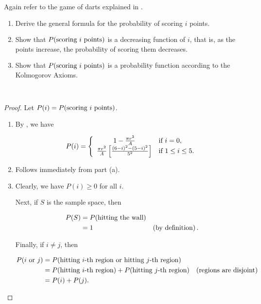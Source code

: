 \documentclass[12pt,letterpaper,reqno]{amsart}
\numberwithin{equation}{subsection}
\begin{document}
Again refer to the game of darts explained in \cite[Example 1.2.7 on page 8]{Berger-Casella}.

\begin{enumerate}[label=(\alph*),leftmargin=*]
    \item Derive the general formula for the probability of scoring $i$ points.
    \item Show that ${P}\! \left( {\mbox{scoring $i$ points}} \right)$ is a decreasing function of $i$, that is, as the points increase, the probability of scoring them decreases.
    \item Show that ${P}\! \left( {\mbox{scoring $i$ points}} \right)$ is a probability function according to the Kolmogorov Axioms.
\end{enumerate}~\\

\begin{proof} Let $P(i) = {P}\! \left( {\mbox{scoring $i$ points}} \right)$.

\begin{enumerate}[label=(\alph*),leftmargin=*]
    \item By , we have
    
    \[ {P}\! \left( {i} \right) = \left\{ \begin{array}{cl}
         1 - \frac{\pi r^2}{A} & \mbox{if $i = 0$},  \\
         \frac{\pi r^2}{A} \left[ \frac{(6-i)^2 - (5-i)^2}{5^2} \right] & \mbox{if $ 1 \leq i \leq 5$}.
    \end{array} \right. \]
    
    \item Follows immediately from part (a).
    
    \item Clearly, we have $P(i) \geq 0$ for all $i$.
    
    Next, if $S$ is the sample space, then
    
    \begin{align*}
        P(S) &= {P}\! \left( {\mbox{hitting the wall}} \right) \\
             &= 1 & \left( \mbox{by definition} \right).
    \end{align*}
    
    Finally, if $i \not= j$, then
    
    \begin{align*}
        {P}\! \left( {\mbox{$i$ or $j$}} \right) &= {P}\! \left( {\mbox{hitting $i$-th region or hitting $j$-th region}} \right) \\
        &= {P}\! \left( {\mbox{hitting $i$-th region}} \right) + {P}\! \left( {\mbox{hitting $j$-th region}} \right) & \left( \mbox{regions are disjoint} \right) \\
        &= P(i) + P(j).
    \end{align*}
\end{enumerate}
\end{proof}
\end{document}
